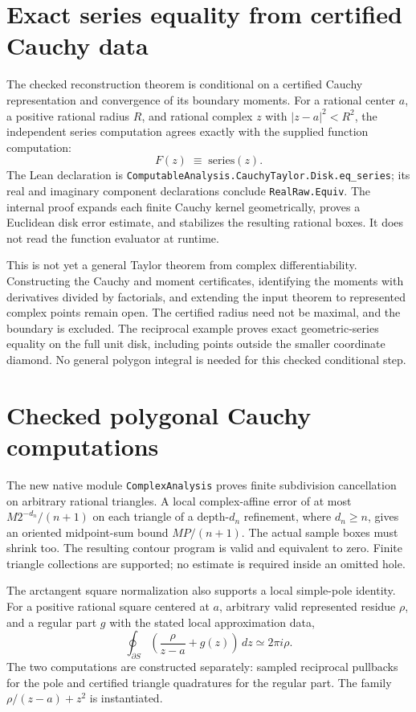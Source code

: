 \section{Exact series equality from certified Cauchy data}
The checked reconstruction theorem is conditional on a certified Cauchy
representation and convergence of its boundary moments.  For a rational
center $a$, a positive rational radius $R$, and rational complex $z$ with
$|z-a|^2<R^2$, the independent series computation agrees exactly with the
supplied function computation:
\[
 F(z)\;\equiv\;\mathrm{series}(z).
\]
The Lean declaration is
\texttt{ComputableAnalysis.CauchyTaylor.Disk.eq\_series}; its real and
imaginary component declarations conclude \texttt{RealRaw.Equiv}.
The internal proof expands each finite Cauchy kernel geometrically, proves a
Euclidean disk error estimate, and stabilizes the resulting rational boxes.
It does not read the function evaluator at runtime.

This is not yet a general Taylor theorem from complex differentiability.
Constructing the Cauchy and moment certificates, identifying the moments
with derivatives divided by factorials, and extending the input theorem to
represented complex points remain open.  The certified radius need not be
maximal, and the boundary is excluded.  The reciprocal example proves exact
geometric-series equality on the full unit disk, including points outside
the smaller coordinate diamond. No general polygon integral is needed for
this checked conditional step.


\section{Checked polygonal Cauchy computations}
\label{sec:polygonal-cauchy-checked}
The new native module \texttt{ComplexAnalysis} proves finite subdivision
cancellation on arbitrary rational triangles. A local complex-affine error
of at most $M2^{-d_n}/(n+1)$ on each triangle of a depth-$d_n$ refinement,
where $d_n\ge n$, gives an oriented midpoint-sum bound $MP/(n+1)$.
The actual sample boxes must shrink too. The resulting contour program is
valid and equivalent to zero. Finite triangle collections are supported;
no estimate is required inside an omitted hole.

The arctangent square normalization also supports a local simple-pole
identity. For a positive rational square centered at $a$, arbitrary valid
represented residue $\rho$, and a regular part $g$ with the stated local
approximation data,
\[
 \oint_{\partial S}\left(\frac{\rho}{z-a}+g(z)\right)\,dz
 \simeq2\pi i\rho.
\]
The two computations are constructed separately: sampled reciprocal
pullbacks for the pole and certified triangle quadratures for the regular
part. The family $\rho/(z-a)+z^2$ is instantiated.

